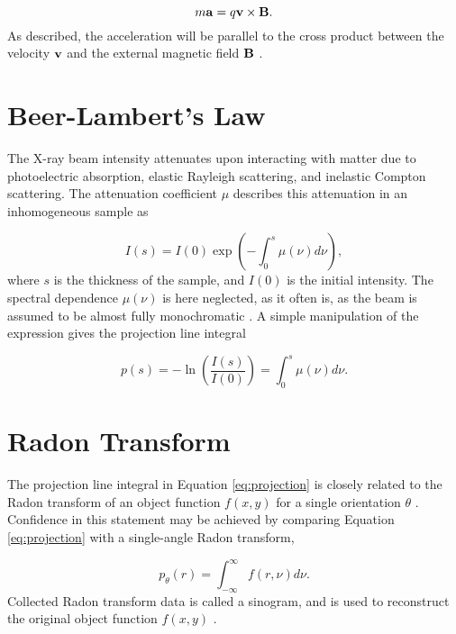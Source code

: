 \begin{equation}\label{eq:Lorentz_force}
    m\bm{\mathrm{a}} = q \bm{\mathrm{v}} \times \bm{\mathrm{B}}.
\end{equation}
As described, the acceleration will be parallel to the cross product between the velocity $\bm{\mathrm{v}}$ and the external magnetic field $\bm{\mathrm{B}}$ \cite{crater1994general}. %


\section{Beer-Lambert's Law}
The X-ray beam intensity attenuates upon interacting with matter due to photoelectric absorption, elastic Rayleigh scattering, and inelastic Compton scattering.
The attenuation coefficient $\mu$ describes this attenuation in an inhomogeneous sample as

\begin{equation}
    I(s) = I(0) \exp(- \int_{0}^{s} \mu(\nu) d\nu),
\end{equation}
\noindent
where $s$ is the thickness of the sample, and $I(0)$ is the initial intensity. The spectral dependence $\mu(\nu)$ is here neglected, as it often is, as the beam is assumed to be almost fully monochromatic \cite{buzug2009computed}.
A simple manipulation of the expression gives the projection line integral

\begin{equation}\label{eq:projection}
    p(s) = -\ln(\frac{I(s)}{I(0)} ) = \int_{0}^{s} \mu(\nu) d\nu.
\end{equation}

\section{Radon Transform}
The projection line integral in Equation \eqref{eq:projection} is closely related to the Radon transform of an object function $f(x,y)$ for a single orientation $\theta$ \cite{zeng2010medical}.
Confidence in this statement may be achieved by comparing Equation \eqref{eq:projection} with a single-angle Radon transform,

\begin{equation}\label{eq:Radon_transform}
    p_{\theta}(r) = \int_{-\infty}^{\infty} f(r,\nu) d\nu.
\end{equation}
Collected Radon transform data is called a sinogram, and is used to reconstruct the original object function $f(x,y)$ \cite{gonzalez2018digital}.

